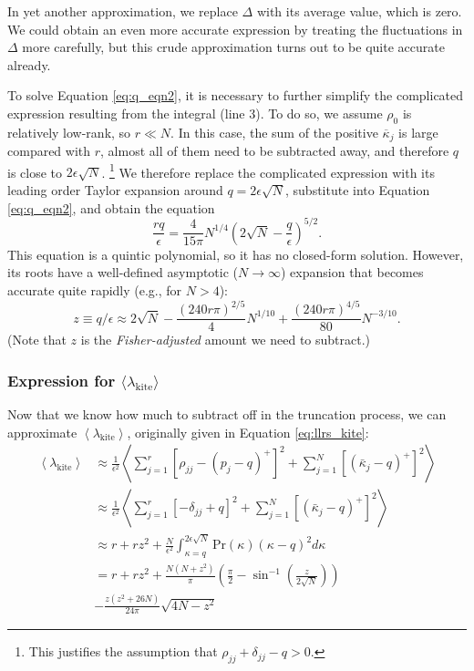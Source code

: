 \documentclass[aps,pra, twocolumn]{revtex4-1}
\newcommand{\expect}[1]{\ensuremath{\left\langle#1\right\rangle}}
\begin{document}
In yet another approximation, we replace $\Delta$ with its average value, which is zero.  We could obtain an even more accurate expression 
 by treating the fluctuations in $\Delta$ more carefully, but this crude approximation turns out to be quite accurate already.

To solve Equation \eqref{eq:q_eqn2}, it is necessary to further simplify the complicated expression resulting from the integral (line 3).  To do so, we 
assume  $\rho_0$ is relatively low-rank, so $r \ll N$.  In this case, the sum of the positive $\overline{\kappa}_j$ is large compared 
with $r$, almost all of them need to be subtracted away, and therefore $q$ is close to $2\epsilon\sqrt{N}$.  \footnote{This justifies the assumption that $\rho_{jj} + \delta_{jj} - q > 0$.} We therefore replace 
the complicated expression with its leading order Taylor expansion around $q=2\epsilon\sqrt{N}$, substitute into Equation \eqref{eq:q_eqn2}, and 
obtain the equation
\begin{equation}
\frac{rq}{\epsilon}  = \frac{4}{15\pi}N^{1/4}\left(2\sqrt{N}-\frac{q}{\epsilon}\right)^{5/2}.
\end{equation}
This equation is a quintic polynomial, so it has no closed-form solution.  However, its roots have a well-defined asymptotic ($N\to
\infty$) expansion that becomes accurate quite rapidly (e.g., for $N>4$):
\begin{equation}
\label{eq:truncation}
z \equiv q/\epsilon \approx 2\sqrt{N}-\frac{(240r\pi)^{2/5}}{4}N^{1/10}+\frac{(240r\pi)^{4/5}}{80}N^{-3/10}.
\end{equation}
(Note that $z$ is the \emph{Fisher-adjusted} amount we need to subtract.)

\subsubsection{Expression for $\langle \lambda_{\mathrm{kite}}\rangle$}
Now that we know how much to subtract off in the truncation process, we can approximate $\expect{\lambda_{\mathrm{kite}}}$, originally given in Equation \eqref{eq:llrs_kite}:
\begin{align}
\nonumber \expect{\lambda_{\mathrm{kite}}} &\approx  \frac{1}{\epsilon^{2}}\left\langle\sum_{j=1}^{r}[\rho_{jj}- (p_j-q)^{+}]^2 + \sum_{j=1}^{N}\left[(\bar{\kappa}_j-q)^+\right]^2 \right\rangle\\
\nonumber &\approx \frac{1}{\epsilon^{2}} \left\langle\sum_{j=1}^{r}[-\delta_{jj} +  q ]^2 + \sum_{j=1}^{N}\left[(\bar{\kappa}_j-q)^+\right]^2 \right\rangle\\
\nonumber  &\approx r + rz^2 + \frac{N}{\epsilon^{2}}\int_{\kappa=q}^{2\epsilon\sqrt{N}}{ \mathrm{Pr}(\kappa)(\kappa-q)^2 d\kappa} \\
\nonumber &=r + rz^{2} + \frac{N(N+z^{2})}{\pi}\left(\frac{\pi}{2} - \sin^{-1}\left(\frac{z}{2\sqrt{N}}\right)\right) \\
& - \frac{z(z^{2}+26N)}{24\pi}\sqrt{4N-z^{2}}
\end{align}
\end{document}
